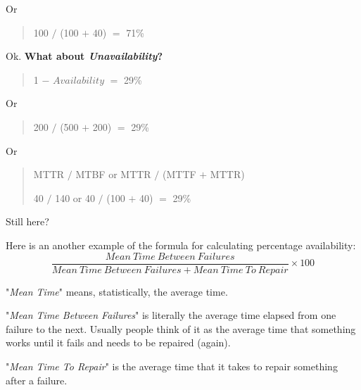 Or

\begin{quote}
100 $/$ (100 $+$ 40)  $=$  71\%
\end{quote}

Ok. \textbf{What about \emph{Unavailability}?}

\begin{quote}
1  $-$  $Availability$  $=$  29\%
\end{quote}

Or
\begin{quote}
200  $/$  (500  $+$  200)  $=$  29\%
\end{quote}

Or

\begin{quote}
MTTR $/$ MTBF or MTTR $/$ (MTTF $+$ MTTR)

40 $/$ 140 or 40 $/$  (100  $+$ 40)  $=$  29\%
\end{quote}


Still here?

Here is an another example of the formula for calculating percentage availability: 
\begin{equation}\label{eq:Percentage Availability}
\frac{Mean~Time~Between~Failures}{Mean~Time~Between~Failures  +  Mean~Time~To~Repair} \times 100
\end{equation}

"\textit{Mean Time}" means, statistically, the average time.

"\textit{Mean Time Between Failures}" is literally the average time elapsed from one failure to the next.  Usually people think of it as the average time that something works until it fails and needs to be repaired (again).

"\textit{Mean Time To Repair}" is the average time that it takes to repair something after a failure.